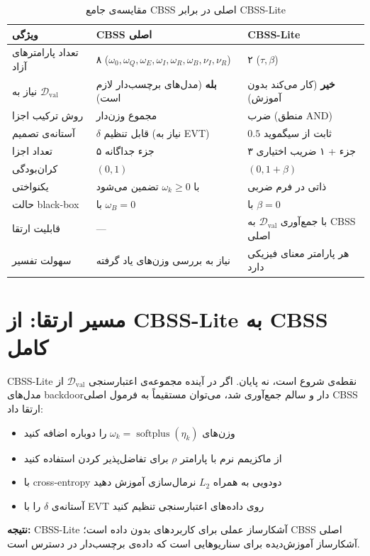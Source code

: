 \documentclass[12pt, a4paper]{article}
\newcommand{\en}[1]{\textenglish{#1}}
\newcommand{\yes}{\textcolor{yesgreen}{\textbf{بله}}}
\newcommand{\no}{\textcolor{nored}{\textbf{خیر}}}
\newcommand{\param}[1]{\textcolor{accent}{\texttt{#1}}}
\DeclareMathOperator{\softplus}{softplus}
\begin{document}
\begin{table}[H]
\centering
\small
\begin{tabularx}{\textwidth}{@{} >{\raggedleft\arraybackslash}p{4.5cm} X X @{}}
\toprule
\textbf{ویژگی} & \textbf{\en{CBSS} اصلی} & \textbf{\en{CBSS-Lite}} \\
\midrule
تعداد پارامترهای آزاد & ۸ (\param{$\omega_0, \omega_Q, \omega_E, \omega_I, \omega_R, \omega_B, \nu_I, \nu_R$}) & ۲ (\param{$\tau, \beta$}) \\[4pt]
نیاز به \param{$\mathcal{D}_{\text{val}}$} & \yes{} (مدل‌های برچسب‌دار لازم است) & \no{} (کار می‌کند بدون آموزش) \\[4pt]
روش ترکیب اجزا & مجموع وزن‌دار & ضرب (منطق \en{AND}) \\[4pt]
آستانه‌ی تصمیم & \param{$\delta$} قابل تنظیم (نیاز به \en{EVT}) & \param{$0.5$} ثابت از سیگموید \\[4pt]
تعداد اجزا & ۵ جزء جداگانه & ۳ جزء + ۱ ضریب اختیاری \\[4pt]
کران‌بودگی & \param{$(0,1)$} & \param{$(0, 1+\beta)$} \\[4pt]
یکنواختی & با \param{$\omega_k \geq 0$} تضمین می‌شود & ذاتی در فرم ضربی \\[4pt]
حالت \en{black-box} & با \param{$\omega_B = 0$} & با \param{$\beta = 0$} \\[4pt]
قابلیت ارتقا & --- & با جمع‌آوری \param{$\mathcal{D}_{\text{val}}$} به \en{CBSS} اصلی \\[4pt]
سهولت تفسیر & نیاز به بررسی وزن‌های یاد گرفته & هر پارامتر معنای فیزیکی دارد \\
\bottomrule
\end{tabularx}
\caption{مقایسه‌ی جامع \en{CBSS} اصلی در برابر \en{CBSS-Lite}}
\end{table}

\section{مسیر ارتقا: از \en{CBSS-Lite} به \en{CBSS} کامل}

\begin{verdictbox}
\en{CBSS-Lite} نقطه‌ی شروع است، نه پایان. اگر در آینده مجموعه‌ی اعتبارسنجی \param{$\mathcal{D}_{\text{val}}$} از مدل‌های \en{backdoor}دار و سالم جمع‌آوری شد، می‌توان مستقیماً به فرمول اصلی \en{CBSS} ارتقا داد:
\begin{itemize}[leftmargin=*]
  \item وزن‌های \param{$\omega_k = \softplus(\eta_k)$} را دوباره اضافه کنید
  \item از ماکزیمم نرم با پارامتر \param{$\rho$} برای تفاضل‌پذیر کردن استفاده کنید
  \item با \en{cross-entropy} دودویی به همراه \param{$L_2$} نرمال‌سازی آموزش دهید
  \item آستانه‌ی \param{$\delta$} را با \en{EVT} روی داده‌های اعتبارسنجی تنظیم کنید
\end{itemize}
\textbf{نتیجه:} \en{CBSS-Lite} آشکارساز عملی برای کاربردهای بدون داده است؛ \en{CBSS} اصلی آشکارساز آموزش‌دیده برای سناریوهایی است که داده‌ی برچسب‌دار در دسترس است.
\end{verdictbox}
\end{document}
